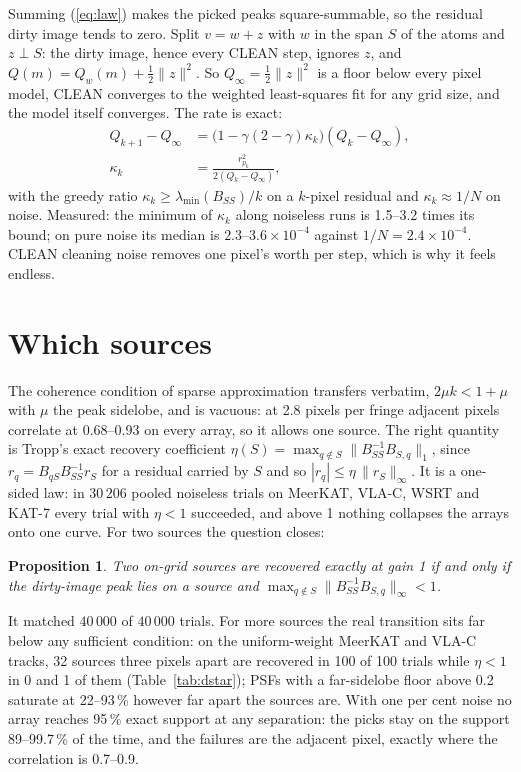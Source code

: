 \documentclass[twocolumn,10pt]{article}
\newtheorem{proposition}{Proposition}
\theoremstyle{remark}
\newcommand{\norm}[1]{\lVert #1\rVert}
\newcommand{\Qinf}{Q_\infty}
\newcommand{\erc}{\eta}
\begin{document}
Summing (\ref{eq:law}) makes the picked peaks square-summable, so the residual dirty image tends to zero. Split $v=w+z$ with $w$ in the span $S$ of the atoms and $z\perp S$: the dirty image, hence every CLEAN step, ignores $z$, and $Q(m)=Q_w(m)+\tfrac12\norm z^2$. So $\Qinf=\tfrac12\norm z^2$ is a floor below every pixel model, CLEAN converges to the weighted least-squares fit for any grid size, and the model itself converges. The rate is exact:
\begin{align}
Q_{k+1}-\Qinf&=\bigl(1-\gamma(2-\gamma)\kappa_k\bigr)(Q_k-\Qinf),\\
\kappa_k&=\frac{r_{p_k}^2}{2(Q_k-\Qinf)},\nonumber
\end{align}
with the greedy ratio $\kappa_k\ge\lambda_{\min}(B_{SS})/k$ on a $k$-pixel residual and $\kappa_k\approx1/N$ on noise. Measured: the minimum of $\kappa_k$ along noiseless runs is 1.5--3.2 times its bound; on pure noise its median is $2.3$--$3.6\times10^{-4}$ against $1/N=2.4\times10^{-4}$. CLEAN cleaning noise removes one pixel's worth per step, which is why it feels endless.

\section{Which sources}

The coherence condition of sparse approximation \citep{tropp04,gribonval06} transfers verbatim, $2\mu k<1+\mu$ with $\mu$ the peak sidelobe, and is vacuous: at 2.8 pixels per fringe adjacent pixels correlate at 0.68--0.93 on every array, so it allows one source. The right quantity is Tropp's exact recovery coefficient $\erc(S)=\max_{q\notin S}\norm{B_{SS}^{-1}B_{S,q}}_1$, since $r_q=B_{qS}B_{SS}^{-1}r_S$ for a residual carried by $S$ and so $|r_q|\le\erc\,\norm{r_S}_\infty$. It is a one-sided law: in $30\,206$ pooled noiseless trials on MeerKAT, VLA-C, WSRT and KAT-7 every trial with $\erc<1$ succeeded, and above 1 nothing collapses the arrays onto one curve. For two sources the question closes:

\begin{proposition}
Two on-grid sources are recovered exactly at gain 1 if and only if the dirty-image peak lies on a source and $\max_{q\notin S}\norm{B_{SS}^{-1}B_{S,q}}_\infty<1$.
\end{proposition}

It matched $40\,000$ of $40\,000$ trials. For more sources the real transition sits far below any sufficient condition: on the uniform-weight MeerKAT and VLA-C tracks, 32 sources three pixels apart are recovered in 100 of 100 trials while $\erc<1$ in 0 and 1 of them (Table~\ref{tab:dstar}); PSFs with a far-sidelobe floor above 0.2 saturate at 22--93\,\% however far apart the sources are. With one per cent noise no array reaches 95\,\% exact support at any separation: the picks stay on the support 89--99.7\,\% of the time, and the failures are the adjacent pixel, exactly where the correlation is 0.7--0.9.
\end{document}
